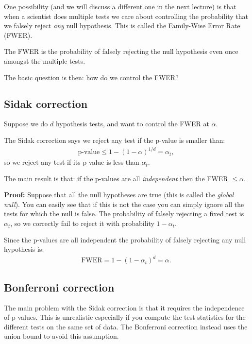 \documentclass[twoside,12pt]{article}
\begin{document}

One possibility (and we will discuss a different one in the next lecture) is that when a scientist does multiple tests we care about controlling the probability that we falsely reject \emph{any} null hypothesis. This is called the Family-Wise Error Rate (FWER).

The FWER is the probability of falsely rejecting the null hypothesis even once amongst the multiple tests. 

The basic question is then: how do we control the FWER?

\subsection{Sidak correction}
Suppose we do $d$ hypothesis tests, and want to control the FWER 
at $\alpha$. 

The Sidak correction says we reject any test if the p-value 
is smaller than:
\begin{align*}
\text{p-value} \leq 1 - (1 - \alpha)^{1/d} = \alpha_t,
\end{align*}
so we reject any test if its p-value is less than $\alpha_t$.

The main result is that: if the p-values are all \emph{independent} then the FWER $\leq \alpha$.

{\bf Proof: } Suppose that all the null hypotheses are true (this is called the \emph{global null}). You can easily see that if this is not the case you can simply ignore all the tests for which the null is false. 
The probability of falsely rejecting a fixed test is $\alpha_t$, so we correctly fail to reject it with probability $1 - \alpha_t$. 

Since the p-values are all independent the probability of falsely rejecting any null hypothesis is:
\begin{align*}
\text{FWER} = 1 - (1 - \alpha_t)^d = \alpha.
\end{align*}




\subsection{Bonferroni correction}
The main problem with the Sidak correction is that it requires the independence of p-values. 
This is unrealistic especially if you compute the test statistics for the different tests on the same
set of data. The Bonferroni
correction instead uses the union bound to avoid this assumption.
\end{document}
